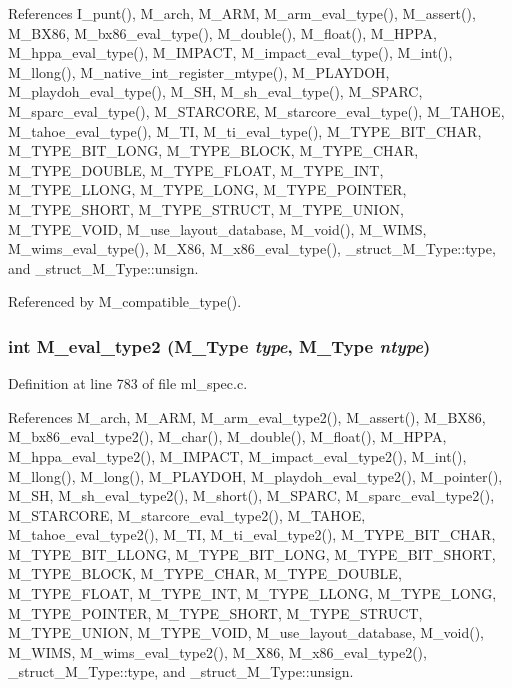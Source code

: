 References I\_\-punt(), M\_\-arch, M\_\-ARM, M\_\-arm\_\-eval\_\-type(), M\_\-assert(), M\_\-BX86, M\_\-bx86\_\-eval\_\-type(), M\_\-double(), M\_\-float(), M\_\-HPPA, M\_\-hppa\_\-eval\_\-type(), M\_\-IMPACT, M\_\-impact\_\-eval\_\-type(), M\_\-int(), M\_\-llong(), M\_\-native\_\-int\_\-register\_\-mtype(), M\_\-PLAYDOH, M\_\-playdoh\_\-eval\_\-type(), M\_\-SH, M\_\-sh\_\-eval\_\-type(), M\_\-SPARC, M\_\-sparc\_\-eval\_\-type(), M\_\-STARCORE, M\_\-starcore\_\-eval\_\-type(), M\_\-TAHOE, M\_\-tahoe\_\-eval\_\-type(), M\_\-TI, M\_\-ti\_\-eval\_\-type(), M\_\-TYPE\_\-BIT\_\-CHAR, M\_\-TYPE\_\-BIT\_\-LONG, M\_\-TYPE\_\-BLOCK, M\_\-TYPE\_\-CHAR, M\_\-TYPE\_\-DOUBLE, M\_\-TYPE\_\-FLOAT, M\_\-TYPE\_\-INT, M\_\-TYPE\_\-LLONG, M\_\-TYPE\_\-LONG, M\_\-TYPE\_\-POINTER, M\_\-TYPE\_\-SHORT, M\_\-TYPE\_\-STRUCT, M\_\-TYPE\_\-UNION, M\_\-TYPE\_\-VOID, M\_\-use\_\-layout\_\-database, M\_\-void(), M\_\-WIMS, M\_\-wims\_\-eval\_\-type(), M\_\-X86, M\_\-x86\_\-eval\_\-type(), \_\-struct\_\-M\_\-Type::type, and \_\-struct\_\-M\_\-Type::unsign.

Referenced by M\_\-compatible\_\-type().
\subsubsection{\setlength{\rightskip}{0pt plus 5cm}int M\_\-eval\_\-type2 (\bf{M\_\-Type} {\em type}, \bf{M\_\-Type} {\em ntype})}\label{m__spec_8h_eef9b61928901886bca65b6be37ea956}




Definition at line 783 of file ml\_\-spec.c.

References M\_\-arch, M\_\-ARM, M\_\-arm\_\-eval\_\-type2(), M\_\-assert(), M\_\-BX86, M\_\-bx86\_\-eval\_\-type2(), M\_\-char(), M\_\-double(), M\_\-float(), M\_\-HPPA, M\_\-hppa\_\-eval\_\-type2(), M\_\-IMPACT, M\_\-impact\_\-eval\_\-type2(), M\_\-int(), M\_\-llong(), M\_\-long(), M\_\-PLAYDOH, M\_\-playdoh\_\-eval\_\-type2(), M\_\-pointer(), M\_\-SH, M\_\-sh\_\-eval\_\-type2(), M\_\-short(), M\_\-SPARC, M\_\-sparc\_\-eval\_\-type2(), M\_\-STARCORE, M\_\-starcore\_\-eval\_\-type2(), M\_\-TAHOE, M\_\-tahoe\_\-eval\_\-type2(), M\_\-TI, M\_\-ti\_\-eval\_\-type2(), M\_\-TYPE\_\-BIT\_\-CHAR, M\_\-TYPE\_\-BIT\_\-LLONG, M\_\-TYPE\_\-BIT\_\-LONG, M\_\-TYPE\_\-BIT\_\-SHORT, M\_\-TYPE\_\-BLOCK, M\_\-TYPE\_\-CHAR, M\_\-TYPE\_\-DOUBLE, M\_\-TYPE\_\-FLOAT, M\_\-TYPE\_\-INT, M\_\-TYPE\_\-LLONG, M\_\-TYPE\_\-LONG, M\_\-TYPE\_\-POINTER, M\_\-TYPE\_\-SHORT, M\_\-TYPE\_\-STRUCT, M\_\-TYPE\_\-UNION, M\_\-TYPE\_\-VOID, M\_\-use\_\-layout\_\-database, M\_\-void(), M\_\-WIMS, M\_\-wims\_\-eval\_\-type2(), M\_\-X86, M\_\-x86\_\-eval\_\-type2(), \_\-struct\_\-M\_\-Type::type, and \_\-struct\_\-M\_\-Type::unsign.
